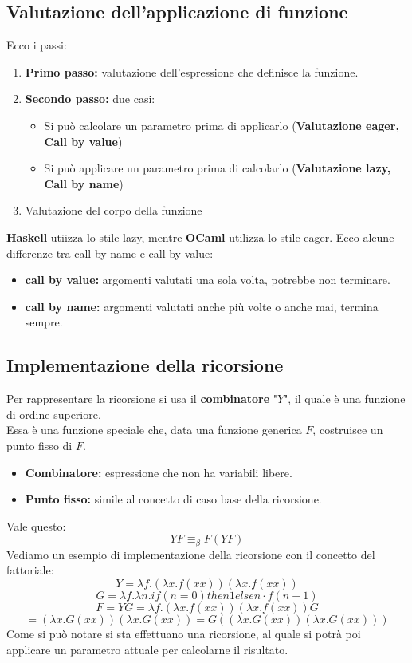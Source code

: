 \documentclass[12pt,a4paper]{article}
\begin{document}
\subsection{Valutazione dell'applicazione di funzione}
Ecco i passi:
\begin{enumerate}
  \item \textbf{Primo passo:} valutazione dell'espressione che definisce la funzione.
  \item \textbf{Secondo passo:} due casi:
  \begin{itemize}
    \item Si può calcolare un parametro prima di applicarlo (\textbf{Valutazione eager, Call by value})
    \item Si può applicare un parametro prima di calcolarlo (\textbf{Valutazione lazy, Call by name})
  \end{itemize}
  \item Valutazione del corpo della funzione
\end{enumerate}
\textbf{Haskell} utiizza lo stile lazy, mentre \textbf{OCaml} utilizza lo stile eager.
Ecco alcune differenze tra call by name e call by value:
\begin{itemize}
  \item \textbf{call by value:} argomenti valutati una sola volta, potrebbe non terminare.
  \item \textbf{call by name:} argomenti valutati anche più volte o anche mai, termina sempre.
\end{itemize}

\subsection{Implementazione della ricorsione}
Per rappresentare la ricorsione si usa il \textbf{combinatore} "$Y$", il quale è una funzione di ordine superiore.\\
Essa è una funzione speciale che, data una funzione generica $F$, costruisce un punto fisso di $F$.\\
\begin{itemize}
  \item \textbf{Combinatore:} espressione che non ha variabili libere.
  \item \textbf{Punto fisso:} simile al concetto di caso base della ricorsione.
\end{itemize}
Vale questo:
\[
YF \equiv_\beta F(YF)
\]
Vediamo un esempio di implementazione della ricorsione con il concetto del fattoriale:\\
\[
Y = \lambda f.(\lambda x.f(xx))(\lambda x.f(xx)) 
\]
\[
G = \lambda f. \lambda n.if(n=0) then 1 else n \cdot f(n-1)
\]
\[
F = YG = \lambda f.(\lambda x.f(xx))(\lambda x.f(xx))G
\]
\[
= (\lambda x.G(xx))(\lambda x.G(xx)) = G((\lambda x.G(xx))(\lambda x.G(xx)))
\]
Come si può notare si sta effettuano una ricorsione, al quale si potrà poi applicare un parametro attuale per calcolarne il risultato.
\end{document}
